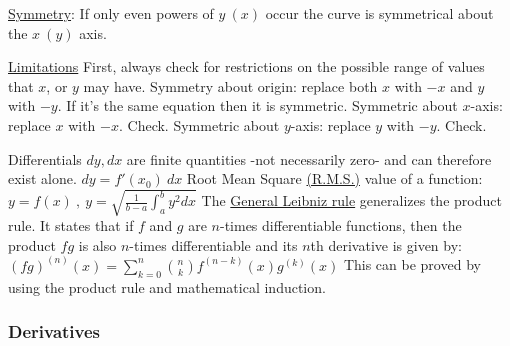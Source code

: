 \documentclass[12pt]{article}
\begin{document}
\begin{flushleft}
	\uline{Symmetry}: \linebreak 
	\textbullet \quad If only even powers of $y \ (x) $ occur the curve is symmetrical about the $x \ (y)$ axis. \linebreak 
	
	\uline{Limitations} \linebreak 
	\textbullet \quad First, always check for restrictions on the possible range of values that $x$, or $y$ may have. \linebreak 
	\textbullet \quad Symmetry about origin: replace both $x$ with $-x$ and $y$ with $-y$. If it's the same equation then it is symmetric. \linebreak 
	\textbullet \quad Symmetric about $x$-axis: replace $x$ with $-x$. Check. \linebreak 
	\textbullet \quad Symmetric about $y$-axis: replace $y$ with $-y$. Check. \linebreak 
	
	\textbullet \quad Differentials $dy, dx$ are finite quantities -not necessarily zero- and can therefore exist alone. $dy = f'(x_0)\ dx$ \linebreak 
	\textbullet \quad Root Mean Square \uline{(R.M.S.)} value of a function: $\displaystyle y=f(x) \ , \ \overset{~}{y} = \sqrt{\frac{1}{b-a} \int_a^b y^2 dx} $ \linebreak 
	\textbullet \quad The \uline{General Leibniz rule} generalizes the product rule. It states that if $f$ and $g$ are $n$-times differentiable functions, then the product $fg$ is also $n$-times differentiable and its $n$th derivative is given by: \linebreak 
	$\displaystyle \left( fg \right)^{(n)} (x) = \sum \limits_{k=0}^n \binom{n}{k} f^{(n-k)} (x) g^{(k)} (x) $ \linebreak 
	This can be proved by using the product rule and mathematical induction. \linebreak 
	
	\subsubsection{Derivatives}
		

\end{flushleft}
\end{document}
